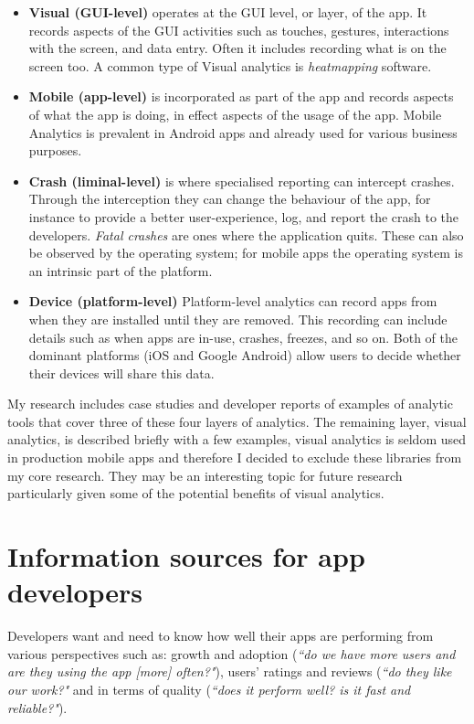 \begin{itemize}
    \item \textbf{Visual (GUI-level)} operates at the GUI level, or layer, of the app. It records aspects of the GUI activities such as touches, gestures, interactions with the screen, and data entry. Often it includes recording what is on the screen too. A common type of Visual analytics is \emph{heatmapping} software.
    \item \textbf{Mobile (app-level)} is incorporated as part of the app and records aspects of what the app is doing, in effect aspects of the usage of the app. Mobile Analytics is prevalent in Android apps and already used for various business purposes.
    \item \textbf{Crash (liminal-level)} is where specialised reporting can intercept crashes. Through the interception they can change the behaviour of the app, for instance to provide a better user-experience, log, and report the crash to the developers. \emph{Fatal crashes} are ones where the application quits. These can also be observed by the operating system; for mobile apps the operating system is an intrinsic part of the platform.
    \item \textbf{Device (platform-level)} Platform-level analytics can record apps from when they are installed until they are removed. This recording can include details such as when apps are in-use, crashes, freezes, and so on. Both of the dominant platforms (iOS and Google Android) allow users to decide whether their devices will share this data.
\end{itemize}


My research includes case studies and developer reports of examples of analytic tools that cover three of these four layers of analytics. The remaining layer, visual analytics, is described briefly with a few examples, visual analytics is seldom used in production mobile apps and therefore I decided to exclude these libraries from my core research. They may be an interesting topic for future research particularly given some of the potential benefits of visual analytics. %


\section{Information sources for app developers}
Developers want and need to know how well their apps are performing from various perspectives such as: growth and adoption (\emph{``do we have more users and are they using the app [more] often?"}), users' ratings and reviews (\emph{``do they like our work?"} and in terms of quality (\emph{``does it perform well? is it fast and reliable?"}). 

